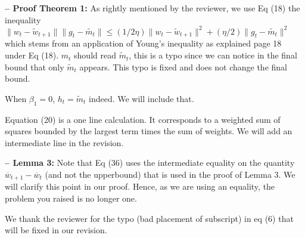 \documentclass[wcp]{jmlr}
\begin{document}
\medskip
\textbf{-- Proof Theorem 1:} As rightly mentioned by the reviewer, we use Eq (18) the inequality $\|w_t-\tilde{w}_{t+1}\|\|g_t-\tilde{m_t}\|\leq (1/2\eta)\|w_t-\tilde{w}_{t+1}\|^2+ (\eta/2)\|g_t-\tilde{m_t}\|^2$ which stems from an application of Young's inequality as explained page 18 under Eq (18). $m_t$ should read $\tilde{m}_t$, this is a typo since we can notice in the final bound that only $\tilde{m}_t$ appears. This typo is fixed and does not change the final bound.

When $\beta_1 = 0$, $h_t = \tilde{m}_t$ indeed. We will include that.

Equation (20) is a one line calculation. It corresponds to a weighted sum of squares bounded by the largest term times the sum of weights.
We will add an intermediate line in the revision.

\medskip
\textbf{-- Lemma 3:}
Note that Eq (36) uses the intermediate equality on the quantity $\overline{w}_{t+1} - \overline{w}_t$ (and not the upperbound) that is used in the proof of Lemma 3. We will clarify this point in our proof.
Hence, as we are using an equality, the problem you raised is no longer one.


We thank the reviewer for the typo (bad placement of subscript) in eq (6) that will be fixed in our revision.
\end{document}
